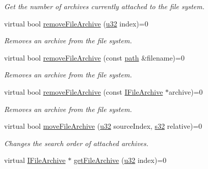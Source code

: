 \begin{DoxyCompactItemize}
\begin{DoxyCompactList}\small\item\em Get the number of archives currently attached to the file system. \end{DoxyCompactList}\item 
virtual bool \hyperlink{classirr_1_1io_1_1IFileSystem_aa509623756c9bcbc3a9bcf455ea2a3ba}{remove\+File\+Archive} (\hyperlink{namespaceirr_a0416a53257075833e7002efd0a18e804}{u32} index)=0
\begin{DoxyCompactList}\small\item\em Removes an archive from the file system. \end{DoxyCompactList}\item 
virtual bool \hyperlink{classirr_1_1io_1_1IFileSystem_a03b405c8f5346c225c590cde585eb73c}{remove\+File\+Archive} (const \hyperlink{namespaceirr_1_1io_ab1bdc45edb3f94d8319c02bc0f840ee1}{path} \&filename)=0
\begin{DoxyCompactList}\small\item\em Removes an archive from the file system. \end{DoxyCompactList}\item 
virtual bool \hyperlink{classirr_1_1io_1_1IFileSystem_ab7579f5ccca7bc7c1e079f5cb38173ed}{remove\+File\+Archive} (const \hyperlink{classirr_1_1io_1_1IFileArchive}{I\+File\+Archive} $\ast$archive)=0
\begin{DoxyCompactList}\small\item\em Removes an archive from the file system. \end{DoxyCompactList}\item 
virtual bool \hyperlink{classirr_1_1io_1_1IFileSystem_ae8530fb9793373cf4dbee956090e99f6}{move\+File\+Archive} (\hyperlink{namespaceirr_a0416a53257075833e7002efd0a18e804}{u32} source\+Index, \hyperlink{namespaceirr_ac66849b7a6ed16e30ebede579f9b47c6}{s32} relative)=0
\begin{DoxyCompactList}\small\item\em Changes the search order of attached archives. \end{DoxyCompactList}\item 
virtual \hyperlink{classirr_1_1io_1_1IFileArchive}{I\+File\+Archive} $\ast$ \hyperlink{classirr_1_1io_1_1IFileSystem_a1ac4bfb7bfd7d2961af8e5c128190fae}{get\+File\+Archive} (\hyperlink{namespaceirr_a0416a53257075833e7002efd0a18e804}{u32} index)=0\hypertarget{classirr_1_1io_1_1IFileSystem_a1ac4bfb7bfd7d2961af8e5c128190fae}{}\label{classirr_1_1io_1_1IFileSystem_a1ac4bfb7bfd7d2961af8e5c128190fae}


\end{DoxyCompactItemize}
